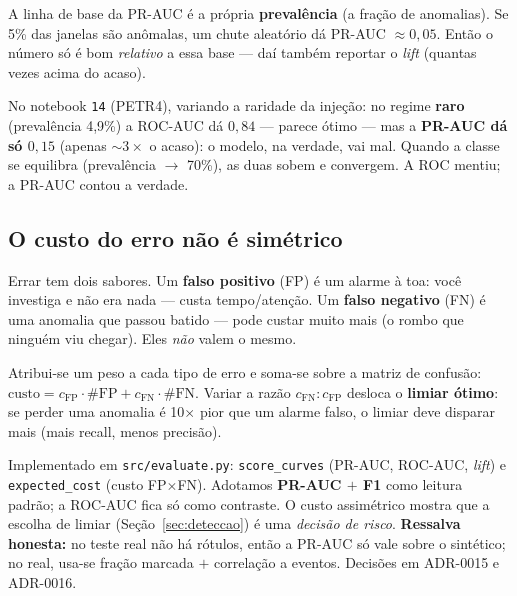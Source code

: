 \begin{intuicao}
A linha de base da PR-AUC é a própria \textbf{prevalência} (a fração de anomalias). Se 5\% das janelas
são anômalas, um chute aleatório dá PR-AUC $\approx 0{,}05$. Então o número só é bom \emph{relativo} a
essa base --- daí também reportar o \emph{lift} (quantas vezes acima do acaso).
\end{intuicao}

\begin{exemplo}
No notebook \texttt{14} (PETR4), variando a raridade da injeção:
no regime \textbf{raro} (prevalência 4,9\%) a ROC-AUC dá $0{,}84$ --- parece ótimo --- mas a
\textbf{PR-AUC dá só $0{,}15$} (apenas ${\sim}3\times$ o acaso): o modelo, na verdade, vai mal. Quando
a classe se equilibra (prevalência $\to$ 70\%), as duas sobem e convergem. A ROC mentiu; a PR-AUC
contou a verdade.
\end{exemplo}

\subsection{O custo do erro não é simétrico}
\label{sec:rara-custo}

\begin{intuicao}
Errar tem dois sabores. Um \textbf{falso positivo} (FP) é um alarme à toa: você investiga e não era
nada --- custa tempo/atenção. Um \textbf{falso negativo} (FN) é uma anomalia que passou batido --- pode
custar muito mais (o rombo que ninguém viu chegar). Eles \emph{não} valem o mesmo.
\end{intuicao}

\begin{definicao}
Atribui-se um peso a cada tipo de erro e soma-se sobre a matriz de confusão:
$\text{custo} = c_{\text{FP}}\cdot \#\text{FP} + c_{\text{FN}}\cdot \#\text{FN}$. Variar a razão
$c_{\text{FN}}{:}c_{\text{FP}}$ desloca o \textbf{limiar ótimo}: se perder uma anomalia é 10$\times$
pior que um alarme falso, o limiar deve disparar mais (mais recall, menos precisão).
\end{definicao}

\begin{naprat}
Implementado em \texttt{src/evaluate.py}: \texttt{score\_curves} (PR-AUC, ROC-AUC, \emph{lift}) e
\texttt{expected\_cost} (custo FP$\times$FN). Adotamos \textbf{PR-AUC $+$ F1} como leitura padrão; a
ROC-AUC fica só como contraste. O custo assimétrico mostra que a escolha de limiar (Seção~\ref{sec:deteccao})
é uma \emph{decisão de risco}. \textbf{Ressalva honesta:} no teste real não há rótulos, então a PR-AUC
só vale sobre o sintético; no real, usa-se fração marcada $+$ correlação a eventos. Decisões em
ADR-0015 e ADR-0016.
\end{naprat}


